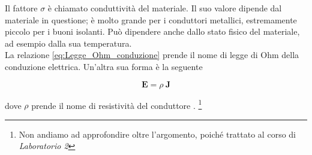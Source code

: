 Il  fattore $\sigma$ è chiamato conduttività del materiale. Il suo valore dipende dal materiale in questione; è molto grande per i conduttori metallici, estremamente piccolo per i buoni isolanti. Può dipendere anche dallo stato fisico del materiale, ad esempio dalla sua temperatura.\\

La relazione \ref{eq:Legge_Ohm_conduzione} prende il nome di legge di Ohm della conduzione elettrica. Un'altra sua forma è la seguente

\begin{tcolorbox}[colback=yellow!10!white, colframe=orange!70!black, boxrule=0.8pt]
\begin{equation}
    \mathbf{E} = \rho \ \mathbf{J}
\end{equation}
\end{tcolorbox}

dove $\rho$ prende il nome di resistività del conduttore . \footnote{Non andiamo ad approfondire oltre l'argomento, poiché trattato al corso di \emph{Laboratorio 2}}
